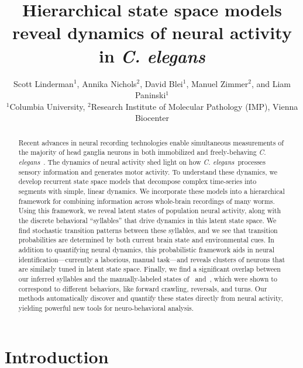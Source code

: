 \documentclass[11pt]{article}
\title{Hierarchical state space models reveal dynamics of neural activity in \textit{C. elegans}}
\author{Scott Linderman$^{\text{1}}$,
  Annika Nichols$^{\text{2}}$,
  David Blei$^{\text{1}}$,
  Manuel Zimmer$^{\text{2}}$,
  and
  Liam Paninski$^{\text{1}}$
  \\
  $^{\text{1}}$Columbia University,
  $^{\text{2}}$Research Institute of Molecular Pathology (IMP), Vienna Biocenter
}
\newcommand{\celegans}{\textit{C. elegans}}
\begin{document}
\doublespacing

\maketitle

\begin{abstract}
  Recent advances in neural recording technologies enable
  simultaneous measurements of the majority of head ganglia neurons in
  both immobilized and freely-behaving
  \celegans~\citep{schrodel2013brain, prevedel2014simultaneous,
    nguyen2016whole}.  The dynamics of neural activity shed light on
  how \celegans~processes sensory information and generates motor
  activity.  To understand these dynamics, we develop recurrent state
  space models that decompose complex time-series into segments with
  simple, linear dynamics. We incorporate these models into a
  hierarchical framework for combining information across whole-brain
  recordings of many worms.  Using this framework, we reveal latent
  states of population neural activity, along with the discrete
  behavioral ``syllables'' that drive dynamics in this latent state
  space.  We find stochastic transition patterns between these
  syllables, and we see that transition probabilities are determined
  by both current brain state and environmental cues.  In
  addition to quantifying neural dynamics, this probabilistic
  framework aids in neural identification---currently a laborious,
  manual task---and reveals clusters of neurons that are similarly
  tuned in latent state space.  Finally, we find a significant overlap
  between our inferred syllables and the manually-labeled states
  of~\citet{kato2015global} and~\citet{nichols2017global}, which were
  shown to correspond to different behaviors, like forward crawling,
  reversals, and turns. Our methods automatically discover and
  quantify these states directly from neural
  activity, yielding powerful new tools for neuro-behavioral analysis.
\end{abstract}

\clearpage

\section*{Introduction}
\end{document}

